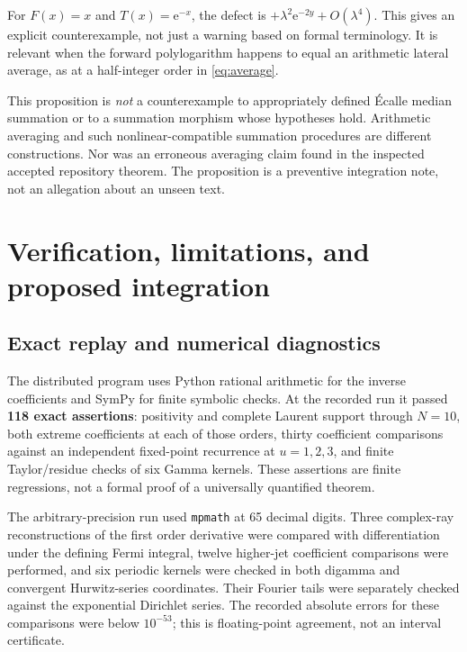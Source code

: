 \documentclass[11pt,a4paper]{article}
\theoremstyle{definition}\newtheorem{definition}[theorem]{Definition}
\theoremstyle{remark}\newtheorem{remark}[theorem]{Remark}
\newcommand{\ee}{\mathrm e}
\numberwithin{equation}{section}
\begin{document}
For $F(x)=x$ and $T(x)=\ee^{-x}$, the defect is
$+\lambda^2\ee^{-2y}+O(\lambda^4)$. This gives an explicit counterexample,
not just a warning based on formal terminology. It is relevant when the
forward polylogarithm happens to equal an arithmetic lateral average,
as at a half-integer order in \eqref{eq:average}.

This proposition is \emph{not} a counterexample to appropriately defined
\'Ecalle median summation or to a summation morphism whose hypotheses
hold. Arithmetic averaging and such nonlinear-compatible summation
procedures are different constructions. Nor was an erroneous averaging
claim found in the inspected accepted repository theorem. The proposition
is a preventive integration note, not an allegation about an unseen text.

\section{Verification, limitations, and proposed integration}\label{sec:verification}

\subsection{Exact replay and numerical diagnostics}

The distributed program  uses Python rational
arithmetic for the inverse coefficients and SymPy for finite symbolic
checks. At the recorded run it passed \textbf{118 exact assertions}:
positivity and complete Laurent support through $N=10$, both extreme
coefficients at each of those orders, thirty coefficient comparisons
against an independent fixed-point recurrence at $u=1,2,3$, and finite
Taylor/residue checks of six Gamma kernels. These assertions are finite
regressions, not a formal proof of a universally quantified theorem.

The arbitrary-precision run used \texttt{mpmath} at 65 decimal digits.
Three complex-ray reconstructions of the first order derivative were
compared with differentiation under the defining Fermi integral, twelve
higher-jet coefficient comparisons were performed, and six periodic
kernels were checked in both digamma and convergent Hurwitz-series
coordinates. Their Fourier tails were separately checked against the
exponential Dirichlet series. The recorded absolute errors for these
comparisons were below $10^{-53}$; this is floating-point agreement,
not an interval certificate.
\end{document}
